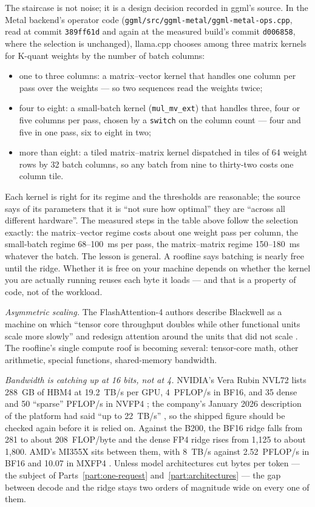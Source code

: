The staircase is not noise; it is a design decision recorded in ggml's source.
In the Metal backend's operator code (\texttt{ggml/src/ggml-metal/ggml-metal-ops.cpp},
read at commit \texttt{389ff61d} and again at the measured build's commit
\texttt{d006858}, where the selection is unchanged), llama.cpp chooses among
three matrix kernels for K-quant weights by the number of batch columns:
\begin{itemize}
\item one to three columns: a matrix--vector kernel that handles one column per
pass over the weights --- so two sequences read the weights twice;
\item four to eight: a small-batch kernel (\texttt{mul\_mv\_ext}) that handles
three, four or five columns per pass, chosen by a \texttt{switch} on the
column count --- four and five in one pass, six to eight in two;
\item more than eight: a tiled matrix--matrix kernel dispatched in tiles of 64
weight rows by 32 batch columns, so any batch from nine to thirty-two costs one
column tile.
\end{itemize}
Each kernel is right for its regime and the thresholds are reasonable; the
source says of its parameters that it is ``not sure how optimal'' they are
``across all different hardware''. The measured steps in the table above follow
the selection exactly: the matrix--vector regime costs about one weight pass per
column, the small-batch regime 68--100~ms per pass, the matrix--matrix regime
150--180~ms whatever the batch. The lesson is general. A roofline says batching
is nearly free until the ridge. Whether it is free on your machine depends on
whether the kernel you are actually running reuses each byte it loads --- and
that is a property of code, not of the workload.


\emph{Asymmetric scaling.} The FlashAttention-4 authors describe Blackwell as a
machine on which ``tensor core throughput doubles while other functional units
scale more slowly'' and redesign attention around the units that did not
scale \cite{zadouri2026flashattention4}. The roofline's single compute roof is
becoming several: tensor-core math, other arithmetic, special functions,
shared-memory bandwidth.

\emph{Bandwidth is catching up at 16 bits, not at 4.} NVIDIA's Vera Rubin
NVL72 lists 288~GB of HBM4 at 19.2~TB/s per GPU, 4~PFLOP/s in BF16, and 35 dense
and 50 ``sparse'' PFLOP/s in NVFP4 \cite{nvidia2026verarubin}; the company's
January 2026 description of the platform had said ``up to 22~TB/s''
\cite{nvidia2026rubinblog}, so the shipped figure should be checked again
before it is relied on. Against the B200, the BF16 ridge falls from 281 to
about 208~FLOP/byte and the dense FP4 ridge rises from 1,125 to about 1,800.
AMD's MI355X sits between them, with 8~TB/s against 2.52~PFLOP/s in BF16 and
10.07 in MXFP4 \cite{amd2025mi355x}. Unless model architectures cut bytes per
token --- the subject of Parts~\ref{part:one-request}
and~\ref{part:architectures} --- the gap between decode and the ridge stays two
orders of magnitude wide on every one of them.

